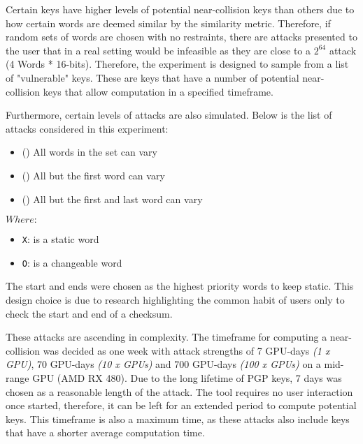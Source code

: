 Certain keys have higher levels of potential near-collision keys than others due to how certain words are deemed similar by the similarity metric. Therefore, if random sets of words are chosen with no restraints, there are attacks presented to the user that in a real setting would be infeasible as they are close to a $2^{64}$ attack (4 Words * 16-bits). Therefore, the experiment is designed to sample from a list of "vulnerable" keys. These are keys that have a number of potential near-collision keys that allow computation in a specified timeframe. 

Furthermore, certain levels of attacks are also simulated. Below is the list of attacks considered in this experiment: 

\begin{itemize}
    \item (\OOOO) All words in the set can vary             
    \item (\XOOO) All but the first word can vary           
    \item (\XOOX) All but the first and last word can vary  
\end{itemize}

$Where: $
\begin{itemize}
    \item[] \verb|X|: is a static word
    \item[] \verb|O|: is a changeable word
\end{itemize}

The start and ends were chosen as the highest priority words to keep static. This design choice is due to research highlighting the common habit of users only to check the start and end of a checksum. 

These attacks are ascending in complexity. The timeframe for computing a near-collision was decided as one week with attack strengths of 7 GPU-days \textit{(1 x GPU)}, 70 GPU-days \textit{(10 x GPUs)} and 700 GPU-days \textit{(100 x GPUs)} on a mid-range GPU (AMD RX 480). Due to the long lifetime of PGP keys, 7 days was chosen as a reasonable length of the attack. The tool requires no user interaction once started, therefore, it can be left for an extended period to compute potential keys. This timeframe is also a maximum time, as these attacks also include keys that have a shorter average computation time.

%     

